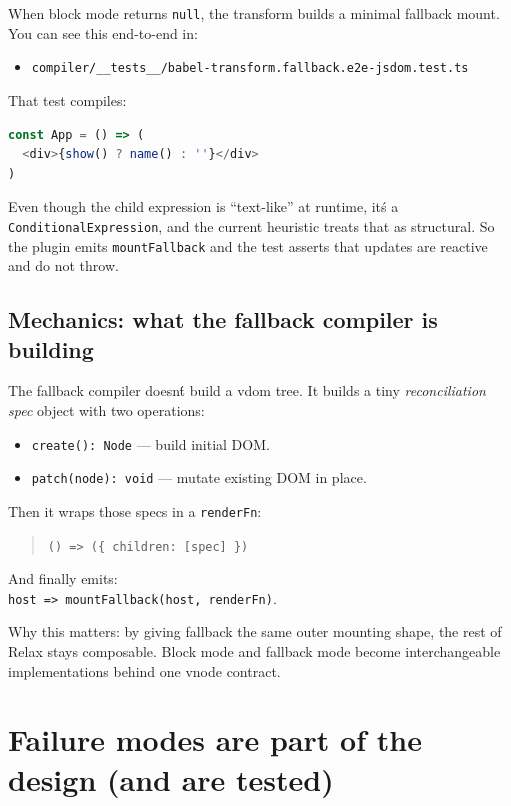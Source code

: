 When block mode returns \texttt{null}, the transform builds a minimal fallback mount.
You can see this end-to-end in:

\begin{itemize}
\item \texttt{compiler/\_\_tests\_\_/babel-transform.fallback.e2e-jsdom.test.ts}
\end{itemize}

That test compiles:

\begin{lstlisting}[language=JavaScript]
const App = () => (
  <div>{show() ? name() : ''}</div>
)
\end{lstlisting}

Even though the child expression is ``text-like'' at runtime, it\'s a \texttt{ConditionalExpression}, and the current heuristic treats that as structural.
So the plugin emits \texttt{mountFallback} and the test asserts that updates are reactive and do not throw.

\subsection{Mechanics: what the fallback compiler is building}

The fallback compiler doesn\'t build a vdom tree.
It builds a tiny \emph{reconciliation spec} object with two operations:

\begin{itemize}
\item \texttt{create(): Node} --- build initial DOM.
\item \texttt{patch(node): void} --- mutate existing DOM in place.
\end{itemize}

Then it wraps those specs in a \texttt{renderFn}:

\begin{quote}
  	\texttt{() => (\{ children: [spec] \})}
\end{quote}

And finally emits:\\
  	\texttt{host => mountFallback(host, renderFn)}.

Why this matters: by giving fallback the same outer mounting shape, the rest of Relax stays composable.
Block mode and fallback mode become interchangeable implementations behind one vnode contract.

\section{Failure modes are part of the design (and are tested)}

